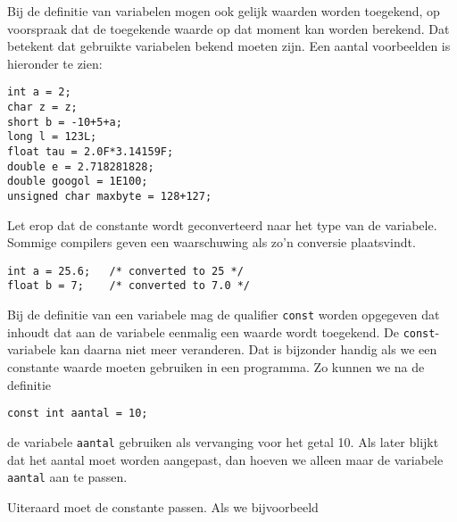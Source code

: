 Bij de definitie van variabelen mogen ook gelijk waarden worden toegekend, op voorspraak dat de toegekende waarde op dat moment kan worden berekend. Dat betekent dat gebruikte variabelen bekend moeten zijn. Een aantal voorbeelden is hieronder te zien:

\hspace*{1em}\texttt{int a = 2;}\\
\hspace*{1em}\texttt{char z = \textquotesingle z\textquotesingle;}\\
\hspace*{1em}\texttt{short b = -10+5+a;}\\
\hspace*{1em}\texttt{long l = 123L;}\\
\hspace*{1em}\texttt{float tau = 2.0F*3.14159F;}\\
\hspace*{1em}\texttt{double e = 2.718281828;}\\
\hspace*{1em}\texttt{double googol = 1E100;}\\
\hspace*{1em}\texttt{unsigned char maxbyte = 128+127;}

Let erop dat de constante wordt geconverteerd naar het type van de variabele. Sommige compilers geven een waarschuwing als zo'n conversie plaatsvindt.

\hspace*{1em}\texttt{int a = 25.6; \ \ /* converted to 25 */}\\
\hspace*{1em}\texttt{float b = 7; \ \ \ /* converted to 7.0 */}

Bij de definitie van een variabele mag de qualifier \texttt{const} worden opgegeven dat inhoudt dat aan  de variabele eenmalig een waarde wordt toegekend. De \texttt{const}-variabele kan daarna niet meer veranderen. Dat is bijzonder handig als we een constante waarde moeten gebruiken in een programma. Zo kunnen we na de definitie

\hspace*{1em}\texttt{const int aantal = 10;}

de variabele \texttt{aantal} gebruiken als vervanging voor het getal 10. Als later blijkt dat het aantal moet worden aangepast, dan hoeven we alleen maar de variabele \texttt{aantal} aan te passen.

Uiteraard moet de constante passen. Als we bijvoorbeeld

